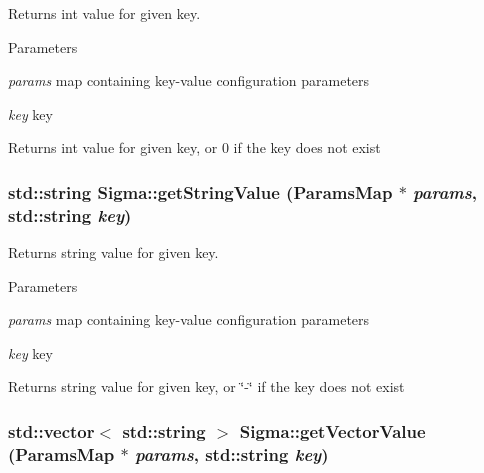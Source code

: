 Returns int value for given key. 
\begin{DoxyParams}{Parameters}
\item[{\em params}]map containing key-\/value configuration parameters \item[{\em key}]key \end{DoxyParams}
\begin{DoxyReturn}{Returns}
int value for given key, or 0 if the key does not exist 
\end{DoxyReturn}
\hypertarget{classSigma_acd4df3477ab84afa7fb7572c9bf5b4df}{
\subsubsection[{getStringValue}]{\setlength{\rightskip}{0pt plus 5cm}std::string Sigma::getStringValue ({\bf ParamsMap} $\ast$ {\em params}, \/  std::string {\em key})}}
\label{classSigma_acd4df3477ab84afa7fb7572c9bf5b4df}


Returns string value for given key. 
\begin{DoxyParams}{Parameters}
\item[{\em params}]map containing key-\/value configuration parameters \item[{\em key}]key \end{DoxyParams}
\begin{DoxyReturn}{Returns}
string value for given key, or \char`\"{}-\/\char`\"{} if the key does not exist 
\end{DoxyReturn}
\hypertarget{classSigma_ab02fc1243a8a4bd0e462d81f27d348c8}{
\subsubsection[{getVectorValue}]{\setlength{\rightskip}{0pt plus 5cm}std::vector$<$ std::string $>$ Sigma::getVectorValue ({\bf ParamsMap} $\ast$ {\em params}, \/  std::string {\em key})}}
\label{classSigma_ab02fc1243a8a4bd0e462d81f27d348c8}


